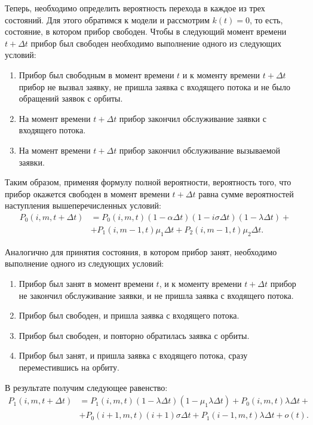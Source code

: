 Теперь, необходимо определить вероятность перехода в каждое из трех состояний. Для этого обратимся к модели и рассмотрим $k(t) = 0$, то есть, состояние, в котором прибор свободен. Чтобы в следующий момент времени $t+\Delta t$ прибор был свободен необходимо выполнение одного из следующих условий:
\begin{enumerate}
	\item Прибор был свободным в момент времени $t$ и к моменту времени $t+\Delta t$  прибор не вызвал заявку, не пришла заявка с входящего потока и не было обращений заявок с орбиты.
	\item На момент времени $t+\Delta t$ прибор закончил обслуживание заявки с входящего потока.
	\item На момент времени $t+\Delta t$ прибор закончил обслуживание вызываемой заявки.
\end{enumerate}
Таким образом, применяя формулу полной вероятности, вероятность того, что прибор окажется свободен в момент времени $t+\Delta t$ равна сумме вероятностей наступления вышеперечисленных условий:
\begin{equation*}
	\begin{split}
	P_{0}(i,m,t+\Delta t) &=P_{0}(i,m,t)(1-\alpha\Delta t)(1 - i\sigma\Delta t)(1-\lambda\Delta t)+ \\ &+ P_{1}(i,m-1,t)\mu_{1}\Delta t + P_{2}(i,m-1,t)\mu_{2}\Delta t.
	\end{split}
\end{equation*}

Аналогично для принятия состояния, в котором прибор занят, необходимо выполнение одного из следующих условий:
\begin{enumerate}
	\item Прибор был занят в момент времени $t$,  и к моменту времени $t+\Delta t$ прибор не закончил обслуживание заявки, и не пришла заявка с входящего потока.
	\item Прибор был свободен, и пришла заявка с входящего потока.
	\item Прибор был свободен, и повторно обратилась заявка с орбиты.
	\item Прибор был занят, и пришла заявка с входящего потока, сразу переместившись на орбиту.
\end{enumerate}
В результате получим следующее равенство:
\begin{equation*}
	\begin{split}
			P_{1}(i,m,t+\Delta t)&=P_{1}(i,m,t)(1-\lambda\Delta t)(1-\mu_{1}\lambda\Delta t)+P_{0}(i,m,t)\lambda\Delta t +\\ &+ P_{0}(i+1,m,t)(i+1)\sigma\Delta t + P_{1}(i-1,m,t)\lambda\Delta t + o(t).
	\end{split}
\end{equation*}

